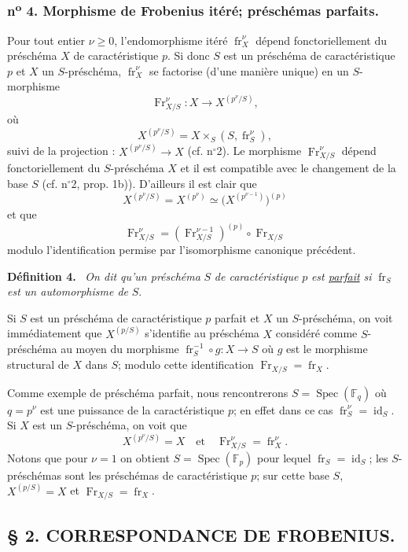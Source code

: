 \documentclass[11pt]{article}
\newenvironment{statement}[1]{\par\medskip\noindent\textbf{#1.}\ }{\par\medskip}
\DeclareMathOperator{\Spec}{Spec}
\providecommand{\id}{\operatorname{id}}
\providecommand{\id}{\operatorname{id}}
\providecommand{\id}{\operatorname{id}}
\providecommand{\id}{\operatorname{id}}
\providecommand{\Spec}{\operatorname{Spec}}
\providecommand{\Spec}{\operatorname{Spec}}
\providecommand{\id}{\operatorname{id}}
\providecommand{\Spec}{\operatorname{Spec}}
\providecommand{\fr}{\operatorname{fr}}
\providecommand{\Fr}{\operatorname{Fr}}
\providecommand{\Fr}{\operatorname{Fr}}
\providecommand{\fr}{\operatorname{fr}}
\providecommand{\Spec}{\operatorname{Spec}}
\providecommand{\id}{\operatorname{id}}
\begin{document}
\subsubsection*{n\textsuperscript{o} 4. Morphisme de Frobenius itéré; préschémas parfaits.}

Pour tout entier $\nu\geq 0$, l'endomorphisme itéré $\fr_X^\nu$ dépend fonctoriellement du préschéma $X$ de caractéristique $p$. Si donc $S$ est un préschéma de caractéristique $p$ et $X$ un $S$-préschéma, $\fr_X^\nu$ se factorise (d'une manière unique) en un $S$-morphisme
\[
\Fr_{X/S}^\nu:X\longrightarrow X^{(p^\nu/S)},
\]
où
\[
X^{(p^\nu/S)}=X\times_S(S,\fr_S^\nu),
\]
suivi de la projection : $X^{(p^\nu/S)}\to X$ (cf. n$^\circ$2). Le morphisme $\Fr_{X/S}^\nu$ dépend fonctoriellement du $S$-préschéma $X$ et il est compatible avec le changement de la base $S$ (cf. n$^\circ$2, prop. 1b)). D'ailleurs il est clair que
\[
X^{(p^\nu/S)}=X^{(p^\nu)}\simeq\bigl(X^{(p^{\nu-1})}\bigr)^{(p)}
\]
et que
\[
\Fr_{X/S}^\nu=(\Fr_{X/S}^{\nu-1})^{(p)}\circ\Fr_{X/S}
\]
modulo l'identification permise par l'isomorphisme canonique précédent.

\begin{statement}{Définition 4}
\emph{On dit qu'un préschéma} $S$ \emph{de caractéristique} $p$ \emph{est \underline{parfait} si} $\fr_S$ \emph{est un automorphisme de} $S$.
\end{statement}

Si $S$ est un préschéma de caractéristique $p$ parfait et $X$ un $S$-préschéma, on voit immédiatement que $X^{(p/S)}$ s'identifie au préschéma $X$ considéré comme $S$-préschéma au moyen du morphisme $\fr_S^{-1}\circ g:X\to S$ où $g$ est le morphisme structural de $X$ dans $S$; modulo cette identification $\Fr_{X/S}=\fr_X$.

Comme exemple de préschéma parfait, nous rencontrerons $S=\Spec(\mathbb F_q)$ où $q=p^\nu$ est une puissance de la caractéristique $p$; en effet dans ce cas $\fr_S^\nu=\id_S$. Si $X$ est un $S$-préschéma, on voit 
que
\[
X^{(p^\nu/S)}=X
\quad\text{et}\quad
\Fr_{X/S}^\nu=\fr_X^\nu.
\]
Notons que pour $\nu=1$ on obtient $S=\Spec(\mathbb F_p)$ pour lequel $\fr_S=\id_S$; les $S$-préschémas sont les préschémas de caractéristique $p$; sur cette base $S$, $X^{(p/S)}=X$ et $\Fr_{X/S}=\fr_X$.

\subsection*{§ 2. CORRESPONDANCE DE FROBENIUS.}
\end{document}
